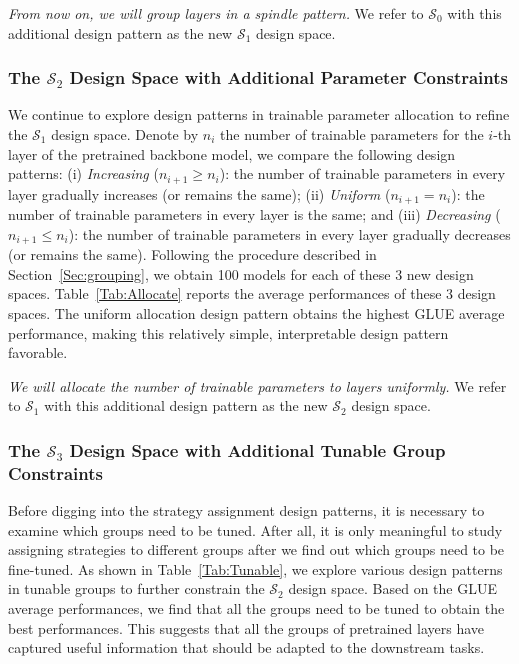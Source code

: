 \emph{From now on, we will group layers in a spindle pattern.} We refer to
$\mathcal{S}_0$ with this additional design pattern as the new $\mathcal{S}_1$ design space.

\subsubsection{The $\mathcal{S}_2$ Design Space with Additional Parameter Constraints}

We continue to explore design patterns in trainable parameter allocation to refine the $\mathcal{S}_1$ design space. Denote by $n_i$ the number of trainable parameters for the $i$-th layer of the pretrained backbone model, we compare the following design patterns: (i) \textit{Increasing} ($n_{i+1} \geq n_i$): the number of trainable parameters in every layer gradually increases (or remains the same); (ii) \textit{Uniform} (${n_{i+1} = n_i}$): the number of trainable parameters in every layer is the same; and (iii) \textit{Decreasing} ($n_{i+1} \leq n_i$): the number of trainable parameters in every layer gradually decreases (or remains the same). Following the procedure described in Section~\ref{Sec:grouping}, 
we obtain 100 models for each of these 3 new design spaces. 
Table~\ref{Tab:Allocate} reports the average performances of these 3 design spaces. The uniform allocation design pattern obtains the highest GLUE average performance, making this relatively simple, interpretable design pattern favorable.

\emph{We will allocate the number of trainable parameters to layers uniformly.} We refer to
$\mathcal{S}_1$ with this additional design pattern as the new $\mathcal{S}_2$ design space.

\subsubsection{The $\mathcal{S}_3$ Design Space with Additional Tunable Group Constraints}

Before digging into the strategy assignment design patterns, it is necessary to examine which groups need to be tuned. After all, it is only meaningful to study assigning strategies to different groups after we find out which groups need to be fine-tuned. As shown in Table~\ref{Tab:Tunable}, we explore various design patterns in tunable groups to further constrain the $\mathcal{S}_2$ design space. Based on the GLUE average performances, we find that all the groups need to be tuned to obtain the best performances. This suggests that all the groups of pretrained layers have captured useful information that should be adapted to the downstream tasks.

